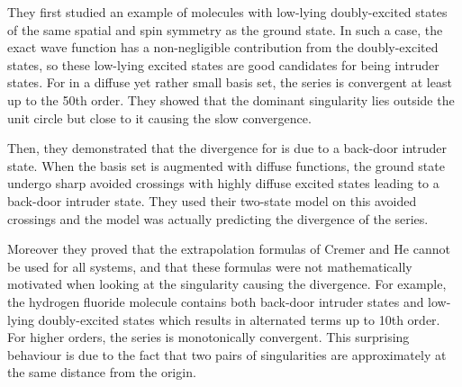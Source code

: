 \documentclass[aps,prb,reprint,noshowkeys,linenumbers,superscriptaddress]{revtex4-1}
\begin{document}
They first studied an example of molecules with low-lying doubly-excited states of the same spatial and spin symmetry as the ground state. \cite{Olsen_2000}
In such a case, the exact wave function has a non-negligible contribution from the doubly-excited states, so these low-lying excited states are good candidates for being intruder states. 
For  in a diffuse yet rather small basis set, the series is convergent at least up to the 50th order. 
They showed that the dominant singularity lies outside the unit circle but close to it causing the slow convergence.

Then, they demonstrated that the divergence for  is due to a back-door intruder state. 
When the basis set is augmented with diffuse functions, the ground state undergo sharp avoided crossings with highly diffuse excited states leading to a back-door intruder state. 
They used their two-state model on this avoided crossings and the model was actually predicting the divergence of the series. 

Moreover they proved that the extrapolation formulas of Cremer and He \cite{Cremer_1996} cannot be used for all systems, and that these formulas were not mathematically motivated when looking at the singularity causing the divergence. 
For example, the hydrogen fluoride molecule contains both back-door intruder states and low-lying doubly-excited states which results in alternated terms up to 10th order. 
For higher orders, the series is monotonically convergent. This surprising behaviour is due to the fact that two pairs of singularities are approximately at the same distance from the origin.
\end{document}
